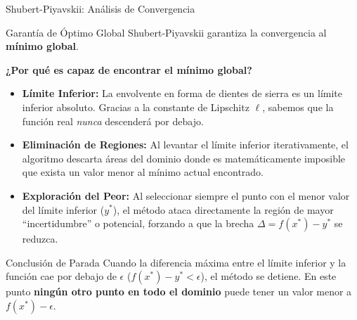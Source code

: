 \begin{frame}{Shubert-Piyavskii: Análisis de Convergencia}
    \begin{block}{Garantía de Óptimo Global}
        \footnotesize
        Shubert-Piyavskii garantiza la convergencia al \textbf{mínimo global}.
    \end{block}

    \vspace{0.2cm}
    \footnotesize
    \textbf{¿Por qué es capaz de encontrar el mínimo global?}
    \scriptsize
    \begin{itemize}
        \item \textbf{Límite Inferior:} La envolvente en forma de dientes de sierra es un límite inferior absoluto. Gracias a la constante de Lipschitz \(\ell\), sabemos que la función real \textit{nunca} descenderá por debajo.
        \item \textbf{Eliminación de Regiones:} Al levantar el límite inferior iterativamente, el algoritmo descarta áreas del dominio donde es matemáticamente imposible que exista un valor menor al mínimo actual encontrado.
        \item \textbf{Exploración del Peor:} Al seleccionar siempre el punto con el menor valor del límite inferior (\(y^*\)), el método ataca directamente la región de mayor ``incertidumbre'' o potencial, forzando a que la brecha \(\Delta = f(x^*) - y^*\) se reduzca.
    \end{itemize}

    \begin{alertblock}{Conclusión de Parada}
        \scriptsize
        Cuando la diferencia máxima entre el límite inferior y la función cae por debajo de \(\epsilon\) (\(f(x^*) - y^* < \epsilon\)), el método se detiene. En este punto \textbf{ningún otro punto en todo el dominio} puede tener un valor menor a \(f(x^*) - \epsilon\).
    \end{alertblock}
\end{frame}